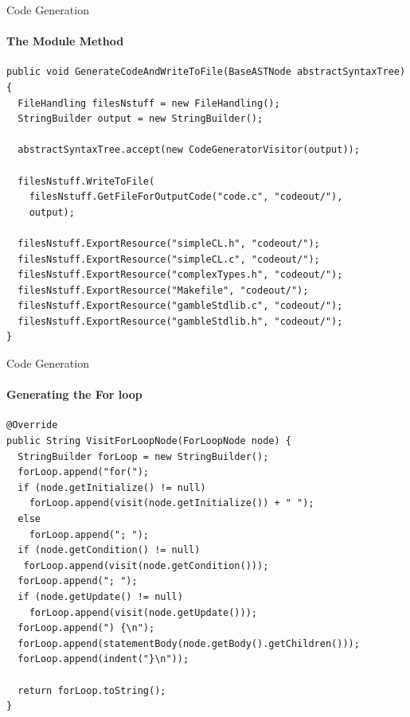 \begin{frame}[fragile,t]{Code Generation}
\framesubtitle{The Module Method}

\begin{lstlisting}[caption=The method called from main performing Code Generation and exporting the files generated along with the needed libraries.,frame=tlrb, basicstyle=\tiny, numbers=none]
public void GenerateCodeAndWriteToFile(BaseASTNode abstractSyntaxTree) {
  FileHandling filesNstuff = new FileHandling();
  StringBuilder output = new StringBuilder();

  abstractSyntaxTree.accept(new CodeGeneratorVisitor(output));

  filesNstuff.WriteToFile(
    filesNstuff.GetFileForOutputCode("code.c", "codeout/"),
    output);

  filesNstuff.ExportResource("simpleCL.h", "codeout/");
  filesNstuff.ExportResource("simpleCL.c", "codeout/");
  filesNstuff.ExportResource("complexTypes.h", "codeout/");
  filesNstuff.ExportResource("Makefile", "codeout/");
  filesNstuff.ExportResource("gambleStdlib.c", "codeout/");
  filesNstuff.ExportResource("gambleStdlib.h", "codeout/");
}

\end{lstlisting}

\end{frame}

\begin{frame}[fragile,t]{Code Generation}
\framesubtitle{Generating the For loop}

\begin{lstlisting}[caption=The visit method called generating code for the for loop.,frame=tlrb, basicstyle=\tiny, numbers=none]
@Override
public String VisitForLoopNode(ForLoopNode node) {
  StringBuilder forLoop = new StringBuilder();
  forLoop.append("for(");
  if (node.getInitialize() != null)
    forLoop.append(visit(node.getInitialize()) + " ");
  else
    forLoop.append("; ");
  if (node.getCondition() != null)
   forLoop.append(visit(node.getCondition()));
  forLoop.append("; ");
  if (node.getUpdate() != null)
    forLoop.append(visit(node.getUpdate()));
  forLoop.append(") {\n");
  forLoop.append(statementBody(node.getBody().getChildren()));
  forLoop.append(indent("}\n"));

  return forLoop.toString();
}

\end{lstlisting}

\end{frame}


